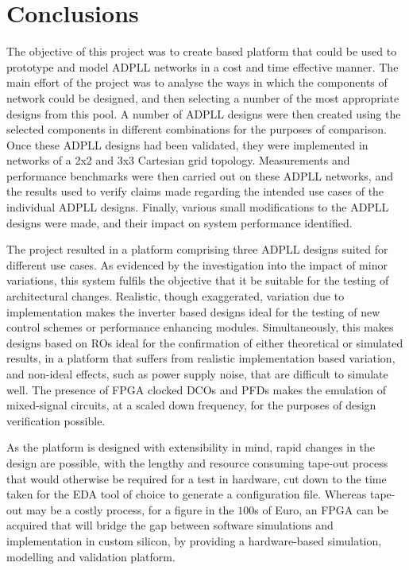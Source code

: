 \section{Conclusions}
The objective of this project was to create  based platform that could be used to prototype and model \acs{ADPLL} networks in a cost and time effective manner. The main effort of the project was to analyse the ways in which the components of  network could be designed, and then selecting a number of the most appropriate designs from this pool. A number of \acs{ADPLL} designs were then created using the selected components in different combinations for the purposes of comparison. Once these \acs{ADPLL} designs had been validated, they were implemented in networks of a 2x2 and 3x3 Cartesian grid topology. Measurements and performance benchmarks were then carried out on these \acs{ADPLL} networks, and the results used to verify claims made regarding the intended use cases of the individual \acs{ADPLL} designs. Finally, various small modifications to the \acs{ADPLL} designs were made, and their impact on system performance identified.

The project resulted in a platform comprising three \acs{ADPLL} designs suited for different use cases. As evidenced by the investigation into the impact of minor variations, this system fulfils the objective that it be suitable for the testing of architectural changes. Realistic, though exaggerated, variation due to implementation makes the inverter based designs ideal for the testing of new control schemes or performance enhancing modules. Simultaneously, this makes designs based on \acsp{RO} ideal for the confirmation of either theoretical or simulated results, in a platform that suffers from realistic implementation based variation, and non-ideal effects, such as power supply noise, that are difficult to simulate well. The presence of \acs{FPGA} clocked \acsp{DCO} and \acsp{PFD} makes the emulation of mixed-signal circuits, at a scaled down frequency, for the purposes of design verification possible.

As the platform is designed with extensibility in mind, rapid changes in the design are possible, with the lengthy and resource consuming tape-out process that would otherwise be required for a test in hardware, cut down to the time taken for the \ac{EDA} tool of choice to generate a configuration file. Whereas tape-out may be a costly process, for a figure in the $100$s of Euro, an \acs{FPGA} can be acquired that will bridge the gap between software simulations and implementation in custom silicon, by providing a hardware-based simulation, modelling and validation platform.

